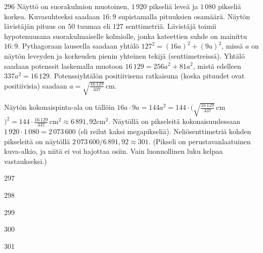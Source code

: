 \begin{Vastaus}{296}
Näyttö on suorakulmion muotoinen, $1\,920$ pikseliä leveä ja $1\,080$ pikseliä korkea. Kuvasuhteeksi saadaan $16:9$ supistamalla pituuksien osamäärä. Näytön lävistäjän pituus on $50$ tuumaa eli $127$ senttimetriä. Lävistäjä toimii hypotenuusana suorakulmaiselle kolmiolle, jonka kateettien suhde on mainittu $16:9$. Pythagoraan lauseella saadaan yhtälö $127^2=(16a)^2+(9a)^2$, missä $a$ on näytön leveyden ja korkeuden pienin yhteinen tekijä (senttimetreissä). Yhtälö saadaan potenssit laskemalla muotoon $16\,129=256a^2+81a^2$, mistä edelleen $337a^2=16\,129$. Potenssiyhtälön positiivisena ratkaisuna (koska pituudet ovat positiivisia) saadaan $a=\sqrt{\frac{16\,129}{337}}$\,cm.

Näytön kokonaispinta-ala on tällöin $16a\cdot 9a=144a^2=144\cdot (\sqrt{\frac{16\,129}{337}}$\,cm$)^2=144\cdot\frac{16\,129}{337}$\,cm$^2\approx 6\,891,92$cm$^2$. Näytöllä on pikseleitä kokonaisuudessaan $1\,920\cdot 1\,080=2\,073\,600$ (eli reilut kaksi megapikseliä). Neliösenttimetriä kohden pikseleitä on näytöllä $2\,073\,600/6\,891,92 \approx 301$. (Pikseli on perustavanlaatuinen kuva-alkio, ja niitä ei voi hajottaa osiin. Vain luonnollinen luku kelpaa vastaukseksi.)
	
\end{Vastaus}
\begin{Vastaus}{297}
	
\end{Vastaus}
\begin{Vastaus}{298}
	
\end{Vastaus}
\begin{Vastaus}{299}
	
\end{Vastaus}
\begin{Vastaus}{300}
    
\end{Vastaus}
\begin{Vastaus}{301}
	
\end{Vastaus}
